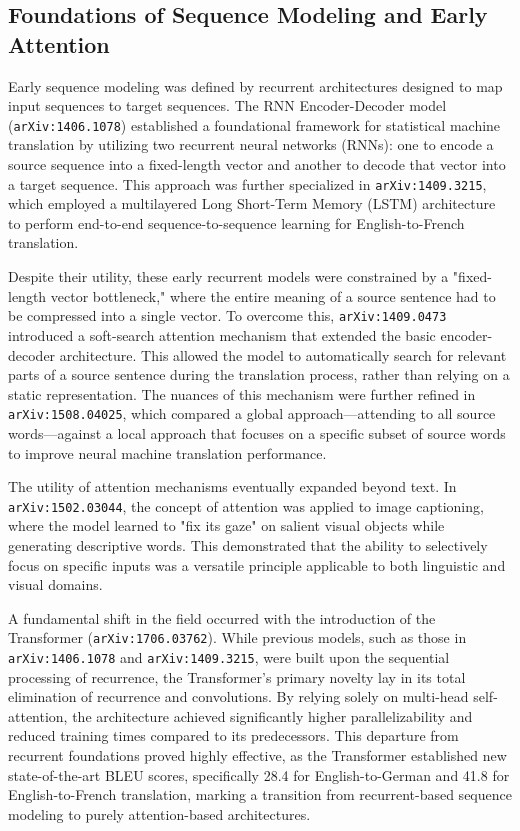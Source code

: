 \documentclass[11pt]{article}
\begin{document}
\subsection{Foundations of Sequence Modeling and Early Attention}

Early sequence modeling was defined by recurrent architectures designed to map input sequences to target sequences. The RNN Encoder-Decoder model (\texttt{arXiv:1406.1078}) established a foundational framework for statistical machine translation by utilizing two recurrent neural networks (RNNs): one to encode a source sequence into a fixed-length vector and another to decode that vector into a target sequence. This approach was further specialized in \texttt{arXiv:1409.3215}, which employed a multilayered Long Short-Term Memory (LSTM) architecture to perform end-to-end sequence-to-sequence learning for English-to-French translation.

Despite their utility, these early recurrent models were constrained by a "fixed-length vector bottleneck," where the entire meaning of a source sentence had to be compressed into a single vector. To overcome this, \texttt{arXiv:1409.0473} introduced a soft-search attention mechanism that extended the basic encoder-decoder architecture. This allowed the model to automatically search for relevant parts of a source sentence during the translation process, rather than relying on a static representation. The nuances of this mechanism were further refined in \texttt{arXiv:1508.04025}, which compared a global approach—attending to all source words—against a local approach that focuses on a specific subset of source words to improve neural machine translation performance.

The utility of attention mechanisms eventually expanded beyond text. In \texttt{arXiv:1502.03044}, the concept of attention was applied to image captioning, where the model learned to "fix its gaze" on salient visual objects while generating descriptive words. This demonstrated that the ability to selectively focus on specific inputs was a versatile principle applicable to both linguistic and visual domains.

A fundamental shift in the field occurred with the introduction of the Transformer (\texttt{arXiv:1706.03762}). While previous models, such as those in \texttt{arXiv:1406.1078} and \texttt{arXiv:1409.3215}, were built upon the sequential processing of recurrence, the Transformer's primary novelty lay in its total elimination of recurrence and convolutions. By relying solely on multi-head self-attention, the architecture achieved significantly higher parallelizability and reduced training times compared to its predecessors. This departure from recurrent foundations proved highly effective, as the Transformer established new state-of-the-art BLEU scores, specifically 28.4 for English-to-German and 41.8 for English-to-French translation, marking a transition from recurrent-based sequence modeling to purely attention-based architectures.
\end{document}
